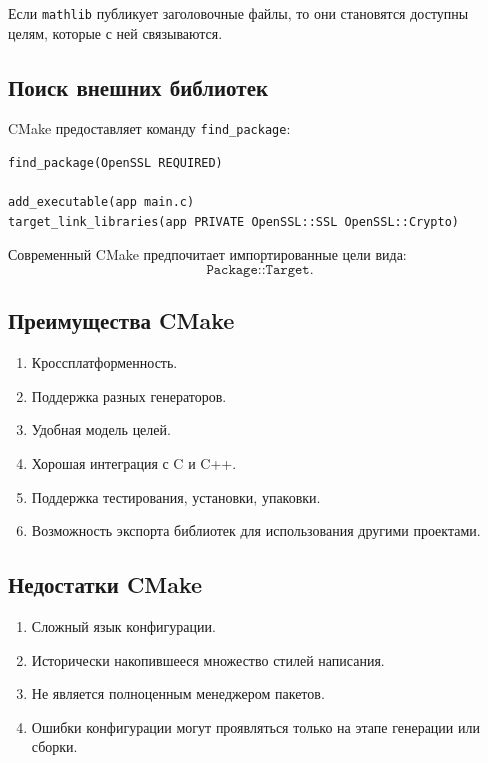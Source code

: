 \documentclass[12pt,a4paper]{article}
\begin{document}
Если \texttt{mathlib} публикует заголовочные файлы, то они становятся доступны целям, которые с ней связываются.

\subsection{Поиск внешних библиотек}

CMake предоставляет команду \texttt{find\_package}:

\begin{lstlisting}
find_package(OpenSSL REQUIRED)

add_executable(app main.c)
target_link_libraries(app PRIVATE OpenSSL::SSL OpenSSL::Crypto)
\end{lstlisting}

Современный CMake предпочитает импортированные цели вида:
\[
\texttt{Package::Target}.
\]

\subsection{Преимущества CMake}

\begin{enumerate}
    \item Кроссплатформенность.
    \item Поддержка разных генераторов.
    \item Удобная модель целей.
    \item Хорошая интеграция с C и C++.
    \item Поддержка тестирования, установки, упаковки.
    \item Возможность экспорта библиотек для использования другими проектами.
\end{enumerate}

\subsection{Недостатки CMake}

\begin{enumerate}
    \item Сложный язык конфигурации.
    \item Исторически накопившееся множество стилей написания.
    \item Не является полноценным менеджером пакетов.
    \item Ошибки конфигурации могут проявляться только на этапе генерации или сборки.
\end{enumerate}
\end{document}
